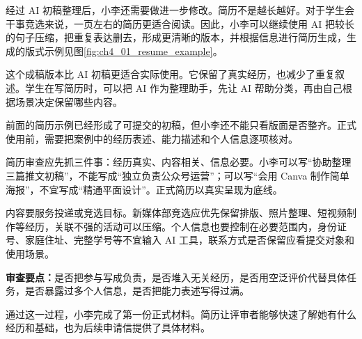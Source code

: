经过 AI 初稿整理后，小李还需要做进一步修改。简历不是越长越好。对于学生会干事竞选来说，一页左右的简历更适合阅读。因此，小李可以继续使用 AI 把较长的句子压缩，把重复表达删去，形成更清晰的版本，并根据信息进行简历生成，生成的版式示例见图\ref{fig:ch4_01_resume_example}。

这个成稿版本比 AI 初稿更适合实际使用。它保留了真实经历，也减少了重复叙述。学生在写简历时，可以把 AI 作为整理助手，先让 AI 帮助分类，再由自己根据场景决定保留哪些内容。

\par
\noindent\begin{minipage}{\textwidth}
\centering
{}
\label{fig:ch4_01_resume_example}
\end{minipage}
\par

\par\vspace{1em}



前面的简历示例已经形成了可提交的初稿，但小李还不能只看版面是否整齐。正式使用前，需要把案例中的经历表述、能力描述和个人信息逐项核对。

\begin{critiquebox}
简历审查应先抓三件事：经历真实、内容相关、信息必要。小李可以写“协助整理三篇推文初稿”，不能写成“独立负责公众号运营”；可以写“会用 Canva 制作简单海报”，不宜写成“精通平面设计”。正式简历以真实呈现为底线\footnotemark。

内容要服务投递或竞选目标。新媒体部竞选应优先保留排版、照片整理、短视频制作等经历，关联不强的活动可以压缩。个人信息也要控制在必要范围内，身份证号、家庭住址、完整学号等不宜输入 AI 工具，联系方式是否保留应看提交对象和使用场景\footnotemark。

\textbf{审查要点：}是否把参与写成负责，是否堆入无关经历，是否用空泛评价代替具体任务，是否暴露过多个人信息，是否把能力表述写得过满。
\end{critiquebox}
\addtocounter{footnote}{-2}



通过这一过程，小李完成了第一份正式材料。简历让评审者能够快速了解她有什么经历和基础，也为后续申请信提供了具体材料。



